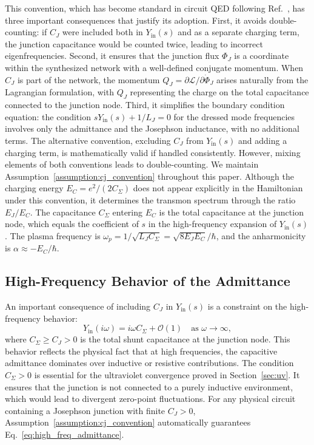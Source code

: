 \documentclass[reprint, floatfix, superscriptaddress, amsmath, amssymb, longbibliography]{revtex4-2}
\begin{document}
This convention, which has become standard in circuit QED following Ref.~\cite{Nigg2012}, has three important consequences that justify its adoption. First, it avoids double-counting: if $C_J$ were included both in $Y_{\mathrm{in}}(s)$ and as a separate charging term, the junction capacitance would be counted twice, leading to incorrect eigenfrequencies. Second, it ensures that the junction flux $\Phi_J$ is a coordinate within the synthesized network with a well-defined conjugate momentum. When $C_J$ is part of the network, the momentum $Q_J = \partial\mathcal{L}/\partial\dot{\Phi}_J$ arises naturally from the Lagrangian formulation, with $Q_J$ representing the charge on the total capacitance connected to the junction node. Third, it simplifies the boundary condition equation: the condition $sY_{\mathrm{in}}(s) + 1/L_J = 0$ for the dressed mode frequencies involves only the admittance and the Josephson inductance, with no additional terms. The alternative convention, excluding $C_J$ from $Y_{\mathrm{in}}(s)$ and adding a charging term, is mathematically valid if handled consistently. However, mixing elements of both conventions leads to double-counting. We maintain Assumption~\ref{assumption:cj_convention} throughout this paper. Although the charging energy $E_C = e^2/(2C_\Sigma)$ does not appear explicitly in the Hamiltonian under this convention, it determines the transmon spectrum through the ratio $E_J/E_C$. The capacitance $C_\Sigma$ entering $E_C$ is the total capacitance at the junction node, which equals the coefficient of $s$ in the high-frequency expansion of $Y_{\mathrm{in}}(s)$. The plasma frequency is $\omega_p = 1/\sqrt{L_J C_\Sigma} = \sqrt{8E_J E_C}/\hbar$, and the anharmonicity is $\alpha \approx -E_C/\hbar$.

\subsection{High-Frequency Behavior of the Admittance}
\label{sec:high_freq}

An important consequence of including $C_J$ in $Y_{\mathrm{in}}(s)$ is a constraint on the high-frequency behavior:
\begin{equation}
Y_{\mathrm{in}}(i\omega) = i\omega C_\Sigma + \mathcal{O}(1) \quad \text{as } \omega \to \infty,
\label{eq:high_freq_admittance}
\end{equation}
where $C_\Sigma \geq C_J > 0$ is the total shunt capacitance at the junction node. This behavior reflects the physical fact that at high frequencies, the capacitive admittance dominates over inductive or resistive contributions. The condition $C_\Sigma > 0$ is essential for the ultraviolet convergence proved in Section~\ref{sec:uv}. It ensures that the junction is not connected to a purely inductive environment, which would lead to divergent zero-point fluctuations. For any physical circuit containing a Josephson junction with finite $C_J > 0$, Assumption~\ref{assumption:cj_convention} automatically guarantees Eq.~\eqref{eq:high_freq_admittance}.
\end{document}
